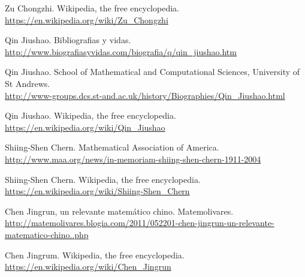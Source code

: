 \begin{thebibliography}{10}
Zu Chongzhi. Wikipedia, the free encyclopedia.\\
  \url{https://en.wikipedia.org/wiki/Zu_Chongzhi}
  
Qin Jiushao. Bibliografias y vidas.\\
  \url{http://www.biografiasyvidas.com/biografia/q/qin_jiushao.htm}

Qin Jiushao. School of Mathematical and Computational Sciences, University of St Andrews.\\
  \url{http://www-groups.dcs.st-and.ac.uk/history/Biographies/Qin_Jiushao.html}

Qin Jiushao. Wikipedia, the free encyclopedia.\\
  \url{https://en.wikipedia.org/wiki/Qin_Jiushao}

Shiing-Shen Chern. Mathematical Association of America.\\
  \url{http://www.maa.org/news/in-memoriam-shiing-shen-chern-1911-2004}

Shiing-Shen Chern. Wikipedia, the free encyclopedia.\\
  \url{https://en.wikipedia.org/wiki/Shiing-Shen_Chern}

Chen Jingrun, un relevante matemático chino. Matemolivares.\\
  \url{http://matemolivares.blogia.com/2011/052201-chen-jingrun-un-relevante-matematico-chino..php}

Chen Jingrum. Wikipedia, the free encyclopedia.\\
  \url{https://en.wikipedia.org/wiki/Chen_Jingrun}


\end{thebibliography}
